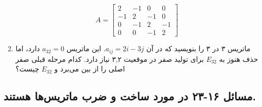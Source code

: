 \documentclass[12pt, a4paper]{book}
\begin{document}
\begin{enumerate}
		\[ A = \begin{bmatrix} 2 & -1 & 0 & 0 \\ -1 & 2 & -1 & 0 \\ 0 & -1 & 2 & -1 \\ 0 & 0 & -1 & 2 \end{bmatrix} \]
		\item ماتریس ۳ در ۳ را بنویسید که در آن $a_{ij}=2i-3j$. این ماتریس $a_{32}=0$ دارد، اما حذف هنوز به $E_{32}$ برای تولید صفر در موقعیت ۳,۲ نیاز دارد. کدام مرحله قبلی صفر اصلی را از بین می‌برد و $E_{32}$ چیست؟
	\end{enumerate}
	
	\subsection*{مسائل ۱۶-۲۳ در مورد ساخت و ضرب ماتریس‌ها هستند.}
\end{document}

